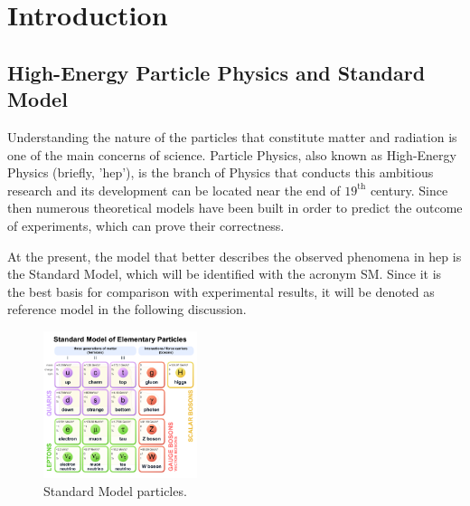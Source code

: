 \mainmatter
\chapter{Introduction}
\label{chap:Introduction}





\section{High-Energy Particle Physics and Standard Model}
Understanding the nature of the particles that constitute matter and radiation is one of the main concerns of science. Particle Physics, also known as High-Energy Physics (briefly, 'hep'), is the branch of Physics that conducts this ambitious research and its development can be located near the end of $19^\mathrm{th}$ century. Since then numerous theoretical models have been built in order to predict the outcome of experiments, which can prove their correctness.

At the present, the model that better describes the observed phenomena in hep is the Standard Model, which will be identified with the acronym SM. Since it is the best basis for comparison with experimental results, it will be denoted as reference model in the following discussion. 

\begin{figure}[H]
	\centering
	\includegraphics[width=0.4\textwidth]{Images/Introduction/SM_particles.pdf}
	\caption{Standard Model particles.}
	\label{fig:SM_PARTICLES}
\end{figure}

